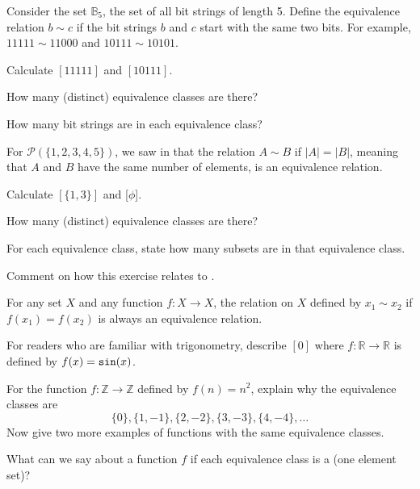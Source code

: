 \begin{exer}[\exerU] %
\label{exer_bs_equiv_same_2bits}
    Consider the set $\mathbb{B}_5$, the set of all bit strings of length 5.  Define the equivalence relation $b \sim c$ if the bit strings $b$ and $c$ start with the same two bits.  For example, $11111 \sim 11000$ and $10111 \sim 10101$.
        \begin{exerpart}
            \item Calculate $[11111]$ and $[10111]$.  
            \item How many (distinct) equivalence classes are there?
            \item How many bit strings are in each equivalence class?
        \end{exerpart}
\end{exer}

\begin{exer}[\exerU] %
\label{exer_equiv_classes_same_size_sets}
    For $\mathscr{P}(\{1,2,3,4,5\})$, we saw in  that the relation $A \sim B$ if $|A| = |B|$, meaning that $A$ and $B$ have the same number of elements, is an equivalence relation.
        \begin{exerpart}
            \item Calculate $[\{1,3\}]$ and [$\phi$].
            \item How many (distinct) equivalence classes are there?
            \item For each equivalence class, state how many subsets are in that equivalence class. 
            \item Comment on how this exercise relates to .
        \end{exerpart}
\end{exer}

\begin{exer}[\exerU] %
\label{exer_equiv_classes_fns}
    For any set $X$ and any function $f:X \to X$, the relation on $X$ defined by  $x_1 \sim x_2$ if $f(x_1) = f(x_2)$ is always an equivalence relation.   
        \begin{exerpart} 
            \item For readers who are familiar with trigonometry, describe $[0]$ where $f: \mathbb{R} \to \mathbb{R}$ is defined by $f(x) = \texttt{sin}(x)$.
            \item For the function $f: \mathbb{Z} \to \mathbb{Z}$ defined by $f(n) = n^2$, explain why the equivalence classes are $$\{0\}, \{1,-1\}, \{2,-2\}, \{3,-3\}, \{4,-4\}, \ldots$$  Now give two more examples of functions with the same equivalence classes.
            \item What can we say about a function $f$ if each equivalence class is a  (one element set)?
        \end{exerpart} 
\end{exer}

